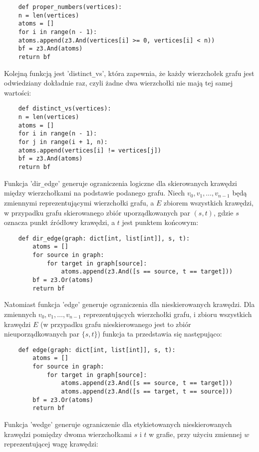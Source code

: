 \begin{lstlisting}
	def proper_numbers(vertices):
	n = len(vertices)
	atoms = []
	for i in range(n - 1):
	atoms.append(z3.And(vertices[i] >= 0, vertices[i] < n))
	bf = z3.And(atoms)
	return bf
\end{lstlisting}
\vspace{1cm}

Kolejną funkcją jest 'distinct\verb|_|vs', która zapewnia, że każdy wierzchołek grafu jest odwiedziany dokładnie raz, czyli żadne dwa wierzchołki nie mają tej samej wartości:

\begin{lstlisting}	
	def distinct_vs(vertices):
	n = len(vertices)
	atoms = []
	for i in range(n - 1):
	for j in range(i + 1, n):
	atoms.append(vertices[i] != vertices[j])
	bf = z3.And(atoms)
	return bf
\end{lstlisting}
\vspace{1cm}

Funkcja 'dir\verb|_|edge' generuje ograniczenia logiczne dla skierowanych krawędzi między wierzchołkami na podstawie podanego grafu. Niech $v_0, v_1, …, v_{n-1}$ będą zmiennymi reprezentującymi wierzchołki grafu, a \(E\) zbiorem wszystkich krawędzi, w przypadku grafu skierowanego zbiór uporządkowanych par $(s, t)$, gdzie \(s\) oznacza punkt źródłowy krawędzi, a \(t\) jest punktem końcowym:

\begin{lstlisting}	
	def dir_edge(graph: dict[int, list[int]], s, t):
		atoms = []
		for source in graph:
			for target in graph[source]:
				atoms.append(z3.And([s == source, t == target]))
		bf = z3.Or(atoms)
		return bf
\end{lstlisting}

Natomiast funkcja 'edge' generuje ograniczenia dla nieskierowanych krawędzi. Dla zmiennych $v_0, v_1, …, v_{n-1}$ reprezentujących wierzchołki grafu, i zbioru wszystkich krawędzi \(E\) (w przypadku grafu nieskierowanego jest to zbiór nieuporządkowanych par $\{s, t\}$) funkcja ta przedstawia się następująco:

\begin{lstlisting}
	def edge(graph: dict[int, list[int]], s, t):
		atoms = []
		for source in graph:
			for target in graph[source]:
				atoms.append(z3.And([s == source, t == target])) 
				atoms.append(z3.And([s == target, t == source]))
		bf = z3.Or(atoms)
		return bf
\end{lstlisting}

Funkcja 'wedge' generuje ograniczenie dla etykietowanych nieskierowanych krawędzi pomiędzy dwoma wierzchołkami \(s\) i \(t\) w grafie, przy użyciu zmiennej \(w\) reprezentującej wagę krawędzi:

